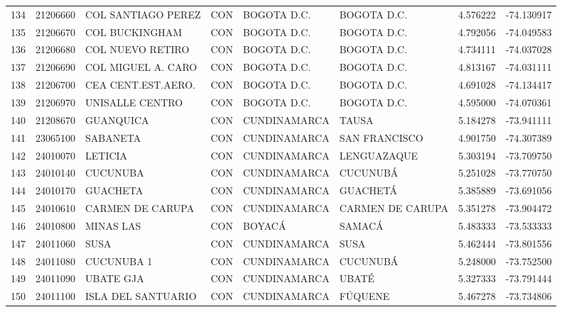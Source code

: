 \documentclass[11pt]{article}
\begin{document}
\begin{table}
\begin{tabular}{lrllllrr}
134 &  21206660 &        COL SANTIAGO PEREZ &  CON &   BOGOTA D.C. &       BOGOTA D.C. &  4.576222 & -74.130917 \\
135 &  21206670 &            COL BUCKINGHAM &  CON &   BOGOTA D.C. &       BOGOTA D.C. &  4.792056 & -74.049583 \\
136 &  21206680 &          COL NUEVO RETIRO &  CON &   BOGOTA D.C. &       BOGOTA D.C. &  4.734111 & -74.037028 \\
137 &  21206690 &        COL MIGUEL A. CARO &  CON &   BOGOTA D.C. &       BOGOTA D.C. &  4.813167 & -74.031111 \\
138 &  21206700 &        CEA CENT.EST.AERO. &  CON &   BOGOTA D.C. &       BOGOTA D.C. &  4.691028 & -74.134417 \\
139 &  21206970 &           UNISALLE CENTRO &  CON &   BOGOTA D.C. &       BOGOTA D.C. &  4.595000 & -74.070361 \\
140 &  21208670 &                GUANQUICA  &  CON &  CUNDINAMARCA &             TAUSA &  5.184278 & -73.941111 \\
141 &  23065100 &                 SABANETA  &  CON &  CUNDINAMARCA &     SAN FRANCISCO &  4.901750 & -74.307389 \\
142 &  24010070 &                  LETICIA  &  CON &  CUNDINAMARCA &       LENGUAZAQUE &  5.303194 & -73.709750 \\
143 &  24010140 &                 CUCUNUBA  &  CON &  CUNDINAMARCA &          CUCUNUBÁ &  5.251028 & -73.770750 \\
144 &  24010170 &                 GUACHETA  &  CON &  CUNDINAMARCA &          GUACHETÁ &  5.385889 & -73.691056 \\
145 &  24010610 &          CARMEN DE CARUPA &  CON &  CUNDINAMARCA &  CARMEN DE CARUPA &  5.351278 & -73.904472 \\
146 &  24010800 &                MINAS LAS  &  CON &        BOYACÁ &            SAMACÁ &  5.483333 & -73.533333 \\
147 &  24011060 &                     SUSA  &  CON &  CUNDINAMARCA &              SUSA &  5.462444 & -73.801556 \\
148 &  24011080 &               CUCUNUBA 1  &  CON &  CUNDINAMARCA &          CUCUNUBÁ &  5.248000 & -73.752500 \\
149 &  24011090 &                UBATE GJA  &  CON &  CUNDINAMARCA &             UBATÉ &  5.327333 & -73.791444 \\
150 &  24011100 &        ISLA DEL SANTUARIO &  CON &  CUNDINAMARCA &           FÚQUENE &  5.467278 & -73.734806 \\

\end{tabular}
\end{table}
\end{document}
